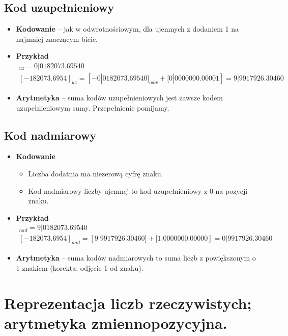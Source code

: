 \documentclass[main.tex]{subfiles}
\begin{document}
    \subsection{Kod uzupełnieniowy}

    \begin{itemize}
        \item \textbf{Kodowanie} -- jak w odwrotnościowym, dla ujemnych z dodaniem 1 na najmniej znaczącym bicie.
        \item \textbf{Przykład}
        \begin{gather*}
        [182073.6954]
            _{uz} = 0|0182073.69540\\
            [-182073.6954]_{uz} = [-0|0182073.69540]_{odw} + [0|0000000.00001] = 9|9917926.30460
        \end{gather*}

        \item \textbf{Arytmetyka} -- suma kodów uzupełnieniowych jest zawsze kodem uzupełnieniowym sumy. Przepełnienie
        pomijamy.
    \end{itemize}

    \subsection{Kod nadmiarowy}
    \begin{itemize}
        \item \textbf{Kodowanie}
        \begin{itemize}[noitemsep]
            \item Liczba dodatnia ma niezerową cyfrę znaku.
            \item Kod nadmiarowy liczby ujemnej to kod uzupełnieniowy z 0 na pozycji znaku.
        \end{itemize}
        \item \textbf{Przykład}
        \begin{gather*}
        [182073.6954]
            _{nad} = 9|0182073.69540\\
            [-182073.6954]_{nad} = [9|9917926.30460] + [1|0000000.00000] = 0|9917926.30460
        \end{gather*}

        \item \textbf{Arytmetyka} -- suma kodów nadmiarowych to suma liczb z powiększonym o 1 znakiem (korekta: odjęcie
        1 od znaku).
    \end{itemize}


    \section{Reprezentacja liczb rzeczywistych; arytmetyka zmiennopozycyjna.}
\end{document}
